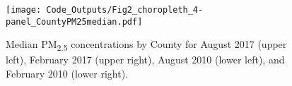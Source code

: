 
\begin{figure} 
\centering  
\texttt{[image: Code\_Outputs/Fig2\_choropleth\_4-panel\_CountyPM25median.pdf]} 
\caption{\label{fig:Fig2_choropleth_4-panelCountyPM25median}Median PM\textsubscript{2.5} concentrations by County for August 2017 (upper left), February 2017 (upper right), August 2010 (lower left), and February 2010 (lower right).} 
\end{figure} 
 
